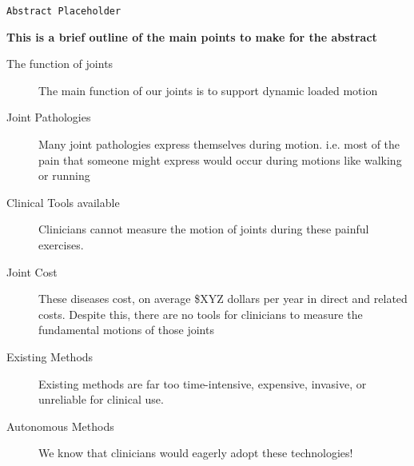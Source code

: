 \texttt{Abstract Placeholder}

{\bf \color{red} This is a brief outline of the main points to make for the abstract}

\begin{description}
    \item[The function of joints] The main function of our joints is to support dynamic loaded motion
    \item[Joint Pathologies] Many joint pathologies express themselves during motion. i.e. most of the pain that someone might express would occur during motions like walking or running
    \item[Clinical Tools available] Clinicians cannot measure the motion of joints during these painful exercises. 
    \item[Joint Cost] These diseases cost, on average \$XYZ dollars per year in direct and related costs. Despite this, there are no tools for clinicians to measure the fundamental motions of those joints
    \item[Existing Methods] Existing methods are far too time-intensive, expensive, invasive, or unreliable for clinical use.
    \item[Autonomous Methods] We know that clinicians would eagerly adopt these technologies!  
\end{description}